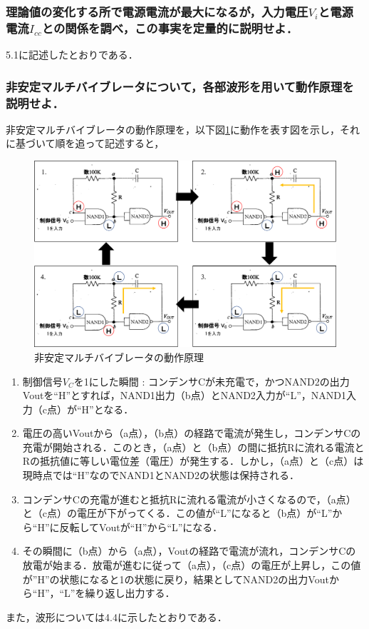\documentclass[10pt, a4j, dvipdfmx]{jarticle}
\makeatletter
\newcommand{\figcaption}[1]{\def\@captype{figure}\caption{#1}}
\makeatother
\begin{document}
\subsubsection{理論値の変化する所で電源電流が最大になるが，入力電圧$V_i$と電源電流$I_{cc}$との関係を調べ，この事実を定量的に説明せよ．}
5.1に記述したとおりである．

\subsubsection{非安定マルチバイブレータについて，各部波形を用いて動作原理を説明せよ．}
非安定マルチバイブレータの動作原理を，以下図\ref{マルチバイブレータ}に動作を表す図を示し，それに基づいて順を追って記述すると，
\begin{figure}[H]
	\centering
	\includegraphics[width=\hsize]{images/動作原理.png}
	\figcaption{非安定マルチバイブレータの動作原理}
	\label{マルチバイブレータ}
\end{figure}
\begin{enumerate}
	\item 制御信号$V_C$を1にした瞬間 : コンデンサCが未充電で，かつNAND2の出力Voutを“H”とすれば，NAND1出力（b点）とNAND2入力が“L”，NAND1入力（c点）が“H”となる．
	\item 電圧の高いVoutから（a点），（b点）の経路で電流が発生し，コンデンサCの充電が開始される．このとき，（a点）と（b点）の間に抵抗Rに流れる電流とRの抵抗値に等しい電位差（電圧）が発生する．しかし，（a点）と（c点）は現時点では“H”なのでNAND1とNAND2の状態は保持される．
	\item コンデンサCの充電が進むと抵抗Rに流れる電流が小さくなるので，（a点）と（c点）の電圧が下がってくる．この値が“L”になると（b点）が“L”から“H”に反転してVoutが“H”から“L”になる．
	\item その瞬間に（b点）から（a点），Voutの経路で電流が流れ，コンデンサCの放電が始まる．放電が進むに従って（a点），（c点）の電圧が上昇し，この値が”H”の状態になると1の状態に戻り，結果としてNAND2の出力Voutから“H”，“L”を繰り返し出力する．
\end{enumerate}
また，波形については4.4に示したとおりである．
\end{document}
